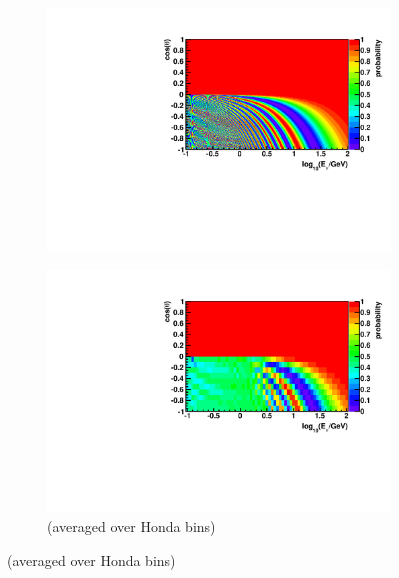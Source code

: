 \documentclass{beamer}
\begin{document}
\begin{frame}
\begin{figure}
		\begin{subfigure}[]{0.45\linewidth}
			\centering
			\vspace{-15pt}
			\caption{ $\overline{\nu}_{\mu} \rightarrow \overline{\nu}_{\mu}$ }
			\vspace{-8pt}
			\includegraphics[width=\linewidth]{atm_numubar2numubar.pdf} \\
			\vspace{-10pt}
			\caption*{(averaged over Honda bins)}
			\vspace{-8pt}
			\includegraphics[width=\linewidth]{atm_numubar2numubar_avg.pdf}
		\end{subfigure}
	\end{figure}
\end{frame}
\end{document}
